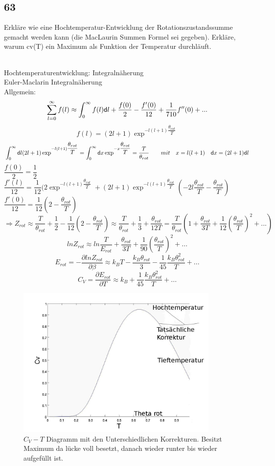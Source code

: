 \subsection{63}
\begin{myfrag}
Erkläre wie eine Hochtemperatur-Entwicklung der Rotationszustandssumme
gemacht werden kann (die MacLaurin Summen Formel sei gegeben). Erkläre,
warum cv(T) ein Maximum als Funktion der Temperatur durchläuft.
\end{myfrag} \quad \\
Hochtemperaturentwicklung: Integralnäherung \\[2ex]
Euler-Maclarin Integralnäherung \\[1ex]
Allgemein: $$ \sum \limits _{l=0}^\infty f(l) \approx \int _0 ^\infty f(l) \mathsf{d} l + \dfrac{f(0)}{2} - \dfrac{f'(0)}{12}+\dfrac{1}{710} f''(0)+ ...$$
 $$ f(l) = ( 2l+1) \exp ^{-l(l+1)\dfrac{\theta _{rot}}{T}}$$
 $$ \int _0^\infty \mathsf{d} l (2l+1)\exp ^{-l(l+1)\dfrac{\theta _{rot}}{T}} = \int _0 ^\infty \mathsf{d} x \exp ^{-x\dfrac{\theta _{rot}}{T}} = \dfrac{T}{\theta_{rot}} \qquad mit \quad x = l(l+1) \quad \mathsf{d} x = (2l+1) \mathsf{d} l$$
 $\dfrac{f(0)}{2}=\dfrac{1}{2}$ \\[1.5ex]
 
 $\dfrac{f'(l)}{12}= \dfrac{1}{12} ( 2 \exp ^{-l(l+1)\dfrac{\theta _{rot}}{T}} + (2l+1) \exp ^{-l(l+1)\dfrac{\theta _{rot}}{T}}\left( -2l\dfrac{\theta_{rot}}{T}-\dfrac{\theta_{rot}}{T} \right)$ \\[1.5ex]
 $\dfrac{f'(0)}{12} = \dfrac{1}{12} \left( 2 - \dfrac{\theta_{rot}}{T} \right)$
 $$\Rightarrow Z_{rot} \approx \dfrac{T}{\theta_{rot}} + \dfrac{1}{2} - \dfrac{1}{12}\left(2-\dfrac{\theta_{rot}}{T} \right) \approx \dfrac{T}{\theta_{rot}} + \dfrac{1}{3} + \dfrac{\theta_{rot}}{12T} = \dfrac{T}{\theta_{rot}} \left( 1+ \dfrac{\theta_{rot}}{3T} + \dfrac{1}{12}\left(\dfrac{\theta_{rot}}{T} \right) ^2 + ... \right)$$
$$ ln Z _{rot} \approx ln \dfrac{T}{E_{rot}} + \dfrac{\theta_{rot}}{3T} + \dfrac{1}{90} \left( \dfrac{\theta _{rot}}{T}\right)^2 + ...$$
$$ E_{rot} = - \dfrac{\partial lnZ_{rot}}{\partial \beta } \approx k_B T - \dfrac{k_B \theta_{rot}}{3} - \dfrac{1}{45} \dfrac{k_B \theta_{rot}^2}{T}+...$$
$$ C_V = \dfrac{\partial E_{rot}}{\partial T} \approx k_B + \dfrac{1}{45} \dfrac{k_B \theta_{rot}^2}{T}+...$$
\begin{figure}[H]
\includegraphics[width= 10cm]{Bilder/Frage63.jpg} 
\caption{$C_V -T $ Diagramm mit den Unterschiedlichen Korrekturen. Besitzt Maximum da lücke voll besetzt, danach wieder runter bis wieder aufgefüllt ist.}

\end{figure}
